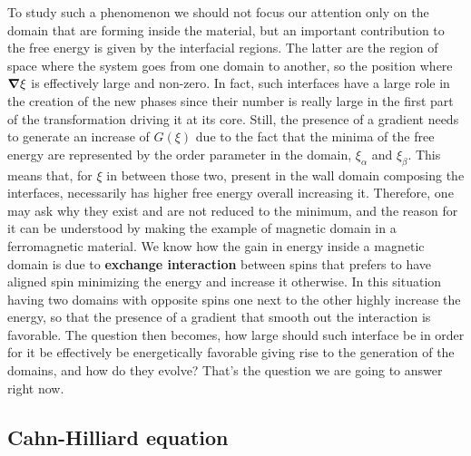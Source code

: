 To study such a phenomenon we should not focus our attention only on the domain that are forming inside the material, but an important contribution to the free energy is given by the interfacial regions. The latter are the region of space where the system goes from one domain to another, so the position where $\grad \xi$ is effectively large and non-zero. In fact, such interfaces have a large role in the creation of the new phases since their number is really large in the first part of the transformation driving it at its core. Still, the presence of a gradient needs to generate an increase of $G(\xi)$ due to the fact that the minima of the free energy are represented by the order parameter in the domain, $\xi_\alpha$ and $\xi_\beta$. This means that, for $\xi$ in between those two, present in the wall domain composing the interfaces, necessarily has higher free energy overall increasing it. Therefore, one may ask why they exist and are not reduced to the minimum, and the reason for it can be understood by making the example of magnetic domain in a ferromagnetic material. We know how the gain in energy inside a magnetic domain is due to \textbf{exchange interaction} between spins that prefers to have aligned spin minimizing the energy and increase it otherwise. In this situation having two domains with opposite spins one next to the other highly increase the energy, so that the presence of a gradient that smooth out the interaction is favorable. The question then becomes, how large should such interface be in order for it be effectively be energetically favorable giving rise to the generation of the domains, and how do they evolve? That's the question we are going to answer right now.

\subsection{Cahn-Hilliard equation}


